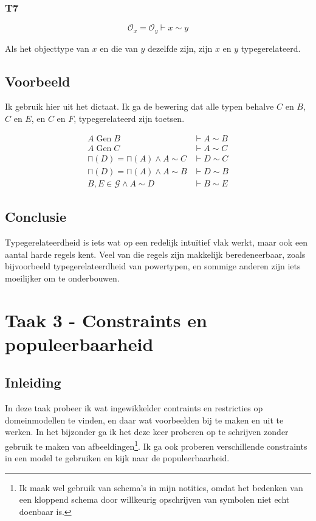 \documentclass{article}
\begin{document}
\subsubsection{T7}
\[
  \mathcal{O}_x = \mathcal{O}_y \vdash x \sim y
\]

Als het objecttype van $x$ en die van $y$ dezelfde zijn, zijn $x$ en $y$ 
typegerelateerd.

\subsection{Voorbeeld}

Ik gebruik hier \cite[figuur 2.26]{dictaat} uit het dictaat. Ik ga de bewering 
dat alle typen behalve $C$ en $B$, $C$ en $E$, en $C$ en $F$, typegerelateerd
zijn toetsen.

\begin{align}
  A \operatorname{Gen} B               & \vdash A \sim B \\
  A \operatorname{Gen} C                & \vdash A \sim C \\
  \sqcap(D) = \sqcap(A) \wedge A \sim C & \vdash D \sim C \\
  \sqcap(D) = \sqcap(A) \wedge A \sim B & \vdash D \sim B \\
  B, E \in \mathcal{G} \wedge A \sim D  & \vdash B \sim E 
\end{align}


%
%
%
%
%
%
%
%
%
%


\subsection{Conclusie}

Typegerelateerdheid is iets wat op een redelijk intu\"itief vlak werkt,
maar ook een aantal harde regels kent. Veel van die regels zijn makkelijk
beredeneerbaar, zoals bijvoorbeeld typegerelateerdheid van powertypen, en 
sommige anderen zijn iets moeilijker om te onderbouwen.

\section{Taak 3 - Constraints en populeerbaarheid}

\subsection{Inleiding}

In deze taak probeer ik wat ingewikkelder contraints en restricties op
domeinmodellen te vinden, en daar wat voorbeelden bij te maken en uit te
werken. In het bijzonder ga ik het deze keer proberen op te schrijven zonder
gebruik te maken van afbeeldingen\footnote{Ik maak wel gebruik van schema's in
mijn notities, omdat het bedenken van een kloppend schema door willkeurig
opschrijven van symbolen niet echt doenbaar is.}. Ik ga ook proberen
verschillende constraints in een model te gebruiken en kijk naar de
populeerbaarheid.
\end{document}
